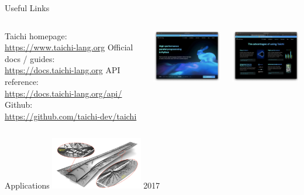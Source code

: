 \begin{frame}{Useful Links}
\begin{columns}
\centering
\begin{outline}
  \1 Taichi homepage: \\ \url{https://www.taichi-lang.org}
  \1 Official docs / guides: \\ \url{https://docs.taichi-lang.org}
  \1 API reference: \\ \url{https://docs.taichi-lang.org/api/}
  \1 Github: \\ \url{https://github.com/taichi-dev/taichi}
\end{outline}
\centering

\includegraphics[width=4.0cm]{taichi_lang_org.png} 

\includegraphics[width=4.0cm]{taichi_lang_org_advantages.png} 

\end{columns}
\end{frame}

\begin{frame}{Applications}
  \includegraphics[width=4.0cm]{giga_opt_diagram.png}
  2017 \cite{Aage2017}
\end{frame}


